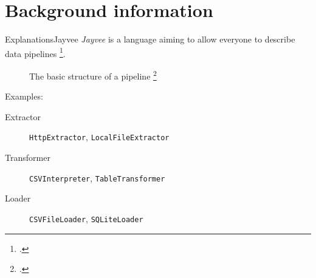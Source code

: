 \section{Background information} %
\begin{frame}[t]{Explanations}{Jayvee}
	\emph{Jayvee} is a language aiming to allow everyone to describe data pipelines \footcite{jvalue:jayvee}.
	\begin{figure}[h]
		\begin{center}
			
		\end{center}
		\caption{The basic structure of a pipeline \footcite{jvalue:jayvee:docs:core_concepts}}
	\end{figure}
	\pause
	Examples:
	\begin{description}
		\item[Extractor] \Verb|HttpExtractor|, \Verb|LocalFileExtractor|
		\item[Transformer] \Verb|CSVInterpreter|, \Verb|TableTransformer|
		\item[Loader] \Verb|CSVFileLoader|, \Verb|SQLiteLoader|
	\end{description}
\end{frame}


